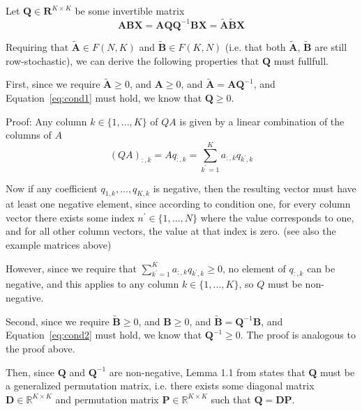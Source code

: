 \documentclass[oneside]{article}
\begin{document}
Let $\mathbf{Q} \in \mathbf{R}^{K \times K}$ be some invertible matrix
\begin{equation}
    \mathbf{A} \mathbf{B} \mathbf{X} = \mathbf{A} \mathbf{Q} \mathbf{Q}^{-1} \mathbf{B} \mathbf{X} = \tilde{\mathbf{A}} \tilde{\mathbf{B}} \mathbf{X}
\end{equation}

Requiring that $\tilde{\mathbf{A}} \in F(N, K)$ and $\tilde{\mathbf{B}} \in F(K, N)$ (i.e. that both $\tilde{\mathbf{A}}$, $\tilde{\mathbf{B}}$ are still row-stochastic), we can derive the following properties that $\mathbf{Q}$ must fullfull.

First, since we require $\tilde{\mathbf{A}} \geq 0$, and $\mathbf{A} \geq 0$, and $\tilde{\mathbf{A}} = \mathbf{A} \mathbf{Q}^{-1}$, and Equation~\eqref{eq:cond1} must hold, we know that $\mathbf{Q} \geq 0$.

Proof: Any column $k \in \{1, ..., K\}$ of $Q A$ is given by a linear combination of the columns of $A$
\begin{equation}
    (Q A)_{:, k} = A q_{:, k} = \sum_{k^\prime = 1}^K a_{:, k} q_{k^\prime, k}
\end{equation}

Now if any coefficient $q_{1, k}, ..., q_{K, k}$ is negative, then the resulting vector must have at least one negative element, since according to condition one, for every column vector there exists some index $n^\prime \in \{1, ..., N\}$ where the value corresponds to one, and for all other column vectors, the value at that index is zero. (see also the example matrices above)

However, since we require that $\sum_{k^\prime = 1}^K a_{:, k} q_{k^\prime, k} \geq 0$, no element of $q_{:, k}$ can be negative, and this applies to any column $k \in \{1, ..., K\}$, so $Q$ must be non-negative.

Second, since we require $\tilde{\mathbf{B}} \geq 0$, and $\mathbf{B} \geq 0$, and $\tilde{\mathbf{B}} = \mathbf{Q}^{-1} \mathbf{B}$, and Equation~\eqref{eq:cond2} must hold, we know that $\mathbf{Q}^{-1} \geq 0$. The proof is analogous to the proof above.

Then, since $\mathbf{Q}$ and $\mathbf{Q}^{-1}$ are non-negative, Lemma 1.1 from \textcite{mincNonnegativeMatrices1988} states that $\mathbf{Q}$ must be a generalized permutation matrix, i.e. there exists some diagonal matrix $\mathbf{D} \in \mathbb{R}^{K \times K}$ and permutation matrix $\mathbf{P} \in \mathbb{R}^{K \times K}$ such that $\mathbf{Q} = \mathbf{D} \mathbf{P}$.
\end{document}
